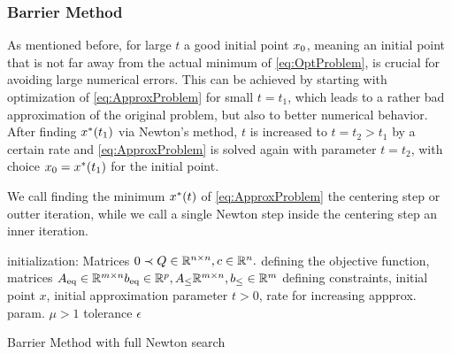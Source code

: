 \subsubsection{Barrier Method}
As mentioned before, for large $ t $ a good initial point $ x_0 $, meaning an initial point that is not far away from the actual minimum of \eqref{eq:OptProblem}, is crucial for avoiding large numerical errors. This can be achieved by starting with optimization of \eqref{eq:ApproxProblem} for small $ t=t_1 $, which leads to a rather bad approximation of the original problem, but also to better numerical behavior. After finding $ x^*(t_1) $ via Newton's method, $ t $ is increased to $ t= t_2 > t_1 $ by a certain rate and  \eqref{eq:ApproxProblem} is solved again with parameter $ t = t_2 $, with choice $ x_0 = x^*(t_1) $ for the initial point.

We call finding the minimum $ x^*(t) $ of  \eqref{eq:ApproxProblem} the centering step or outter iteration, while we call a single Newton step inside  the centering step an inner iteration.


\begin{algorithm}
		\SetAlgoLined
		initialization: Matrices $ 0 \prec Q\in \mathbb{R}^{n \times n}, c\in \mathbb{R}^n. $ defining the objective function, matrices $ {A}_{\mathrm{eq}}\in \mathbb{R}^{m \times n} {b}_{\mathrm{eq}}\in \mathbb{R}^p, {A}_{\mathrm{\leq}}\mathbb{R}^{m\times n}, {b}_{\mathrm{\leq}}\in \mathbb{R}^m $ defining constraints, initial point $ x $, initial approximation parameter $ t > 0 $, rate for increasing appprox. param. $ \mu > 1 $ tolerance $ \epsilon $\;
		\caption{Barrier Method with full Newton search}
		\label{alg:BarrierFullNewton}
\end{algorithm}




